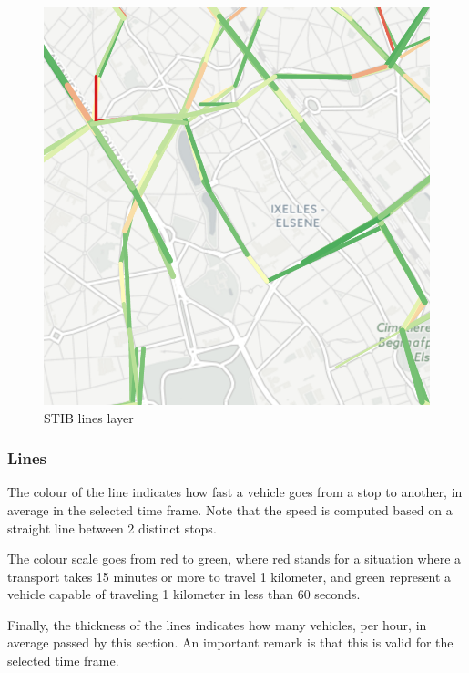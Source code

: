 \documentclass[11pt]{article}%
\begin{document}
\begin{minipage}{0.3\textwidth}
  \begin{figure}[H]
    \includegraphics[width=\textwidth]{images/lines.png}
    \caption{STIB lines layer}
  \end{figure}
\end{minipage}\hfill
\begin{minipage}{0.6\textwidth}
  \subsubsection{Lines}
  The colour of the line indicates how fast a vehicle goes from a stop to another, in average in the selected time frame. Note that the speed is computed based on a straight line between 2 distinct stops.

  The colour scale goes from red to green, where red stands for a situation where a transport takes 15 minutes or more to travel 1 kilometer, and green represent a vehicle capable of traveling 1 kilometer in less than 60 seconds.

  Finally, the thickness of the lines indicates how many vehicles, per hour, in average passed by this section. An important remark is that this is valid for the selected time frame.
\end{minipage}
\end{document}
